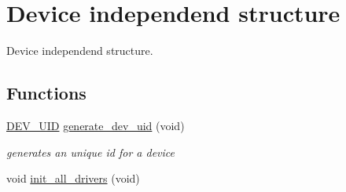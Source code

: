 \hypertarget{group__device__driver}{
\section{Device independend structure}
\label{group__device__driver}
}
Device independend structure.  


\subsection*{Functions}
\begin{CompactItemize}
\item 
\hyperlink{group___d_e_v_i_c_e___a_p_i_g9f427f7fc1dc07b788af60c2aaa6b8d3}{DEV\_\-UID} \hyperlink{group__device__driver_g66f128d4bb74eca88758ca73f2fa4f9c}{generate\_\-dev\_\-uid} (void)
\begin{CompactList}\small\item\em generates an unique id for a device \item\end{CompactList}\item 
\hypertarget{group__device__driver_gdebc80251d3a7020d049c948f308fdea}{
void \hyperlink{group__device__driver_gdebc80251d3a7020d049c948f308fdea}{init\_\-all\_\-drivers} (void)}
\label{group__device__driver_gdebc80251d3a7020d049c948f308fdea}


\end{CompactItemize}
